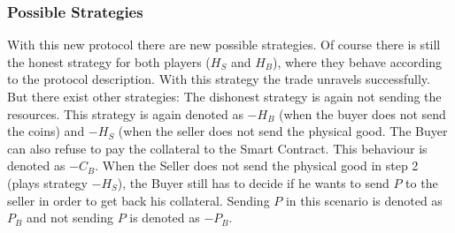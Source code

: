 \documentclass{cacthesis}
\begin{document}
\subsubsection{Possible Strategies}
With this new protocol there are new possible strategies. Of course there is still the honest strategy for both players ($H_S$ and $H_B$), where they behave according to the protocol description. With this strategy the trade unravels successfully.\newline
But there exist other strategies: The dishonest strategy is again not sending the resources. This strategy is again denoted as $-H_B$ (when the buyer does not send the coins) and $-H_S$ (when the seller does not send the physical good.\newline
The Buyer can also refuse to pay the collateral to the Smart Contract. This behaviour is denoted as $-C_B$.\newline
When the Seller does not send the physical good in step 2 (plays strategy $-H_S$), the Buyer still has to decide if he wants to send $P$ to the seller in order to get back his collateral. Sending $P$ in this scenario is denoted as $P_B$ and not sending $P$ is denoted as $-P_B$.\newline
\end{document}
